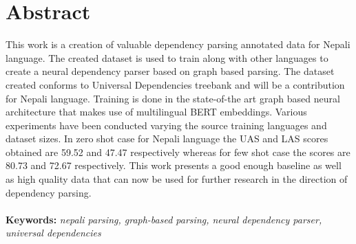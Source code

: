 \chapter*{Abstract}
This work is a creation of valuable dependency parsing annotated data for
Nepali language. The created dataset is used to train along with other
languages to create a neural dependency parser based on graph based parsing.
The dataset created conforms to Universal Dependencies treebank and
will be a contribution for Nepali language. Training is done in the
state-of-the art graph based neural architecture that makes use of
multilingual BERT embeddings. Various experiments have been conducted
varying the source training languages and dataset sizes. In zero shot
case for Nepali language the UAS and LAS scores obtained are 59.52 and
47.47 respectively whereas for few shot case the scores are 80.73 and
72.67 respectively. This work presents a good enough baseline as well
as high quality data that can now be used for further research in the
direction of dependency parsing.
\\~\\
\textbf{Keywords: }\textit{nepali parsing, graph-based parsing, neural dependency parser, universal dependencies}



